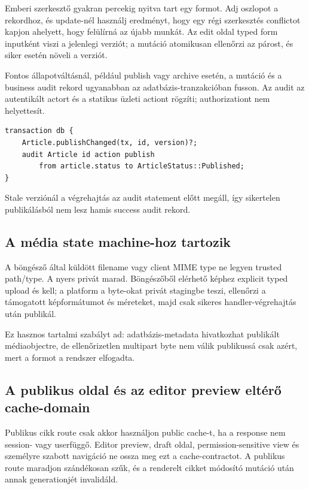 Emberi szerkesztő gyakran percekig nyitva tart egy formot. Adj  oszlopot a rekordhoz, és update-nél használj  eredményt, hogy egy régi szerkesztés conflictot kapjon ahelyett, hogy felülírná az újabb munkát. Az edit oldal typed form inputként viszi a jelenlegi verziót; a mutáció atomikusan ellenőrzi az  párost, és siker esetén növeli a verziót.

Fontos állapotváltásnál, például publish vagy archive esetén, a mutáció és a business audit rekord ugyanabban az adatbázis-tranzakcióban fusson. Az audit az autentikált actort és a statikus üzleti actiont rögzíti; authorizationt nem helyettesít.

\begin{lstlisting}[language=Velran]
transaction db {
    Article.publishChanged(tx, id, version)?;
    audit Article id action publish
        from article.status to ArticleStatus::Published;
}
\end{lstlisting}

Stale verziónál a végrehajtás az audit statement előtt megáll, így sikertelen publikálásból nem lesz hamis success audit rekord.

\subsection*{A média state machine-hoz tartozik}

A böngésző által küldött filename vagy client MIME type ne legyen trusted path/type. A nyers  privát marad. Böngészőből elérhető képhez explicit typed  upload és  kell; a platform a byte-okat privát stagingbe teszi, ellenőrzi a támogatott képformátumot és méreteket, majd csak sikeres handler-végrehajtás után publikál.

Ez hasznos tartalmi szabályt ad: adatbázis-metadata hivatkozhat publikált médiaobjectre, de ellenőrizetlen multipart byte nem válik publikussá csak azért, mert a formot a rendszer elfogadta.

\subsection*{A publikus oldal és az editor preview eltérő cache-domain}

Publikus cikk route csak akkor használjon public cache-t, ha a response nem session- vagy userfüggő. Editor preview, draft oldal, permission-sensitive view és személyre szabott navigáció ne ossza meg ezt a cache-contractot. A publikus route maradjon szándékosan szűk, és a renderelt cikket módosító mutáció után annak generationjét invalidáld.

